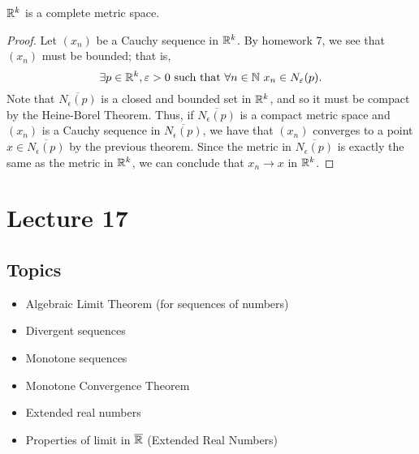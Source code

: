 \documentclass[a4paper]{article}
\begin{document}
\begin{theorem}[\( \R^{k} \) is complete]
    \( \R^{k} \) is a complete metric space.
\end{theorem}

\begin{proof}
Let \( ({x}_{n}) \) be a Cauchy sequence in \( \R^{k} \). By homework 7, we see that \( ({x}_{n}) \) must be bounded; that is,
\[  \exists p \in \R^{k } , \epsilon > 0 \ \text{such that} \ \forall n \in \N \ {x}_{n} \in {N}_{\epsilon}(p). \]
Note that \( \overline{{N}_{\epsilon}(p)}  \) is a closed and bounded set in \( \R^{k} \), and so it must be compact by the Heine-Borel Theorem. Thus, if \( \overline{{N}_{\epsilon}(p)}  \) is a compact metric space and \( ({x}_{n}) \) is a Cauchy sequence in \( \overline{{N}_{\epsilon}(p)} \), we have that \( ({x}_{n}) \) converges to a point \( x \in \overline{{N}_{\epsilon}(p)} \) by the previous theorem. Since the metric in \( \overline{{N}_{\epsilon}(p)} \) is exactly the same as the metric in \( \R^{k} \), we can conclude that \( {x}_{n} \to x  \) in \( \R^{k} \).

\end{proof}

\section{Lecture 17}

\subsection{Topics}
\begin{itemize}
    \item Algebraic Limit Theorem (for sequences of numbers)
    \item Divergent sequences
    \item Monotone sequences 
    \item Monotone Convergence Theorem
    \item Extended real numbers
    \item Properties of limit in \( \overline{\mathbb{R}} \) (Extended Real Numbers)
\end{itemize}
\end{document}
